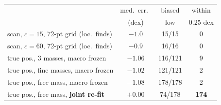 \begin{tabular}{@{}lccc@{}}
\toprule
 & med.\ err.\ & biased & within \\
 & (dex) & low & 0.25 dex \\
\midrule
scan, $c=15$, 72-pt grid (loc.\ finds) & $-1.0$ & 15/15 & 0 \\
scan, $c=60$, 72-pt grid (loc.\ finds) & $-0.9$ & 16/16 & 0 \\
true pos., 3 masses, macro frozen & $-1.06$ & 116/121 & 9 \\
true pos., fine masses, macro frozen & $-1.02$ & 121/121 & 2 \\
true pos., free mass, macro frozen & $-1.08$ & 178/178 & 2 \\
true pos., free mass, \textbf{joint re-fit} & $\mathbf{+0.00}$ & 74/178 & \textbf{174} \\
\bottomrule
\end{tabular}

